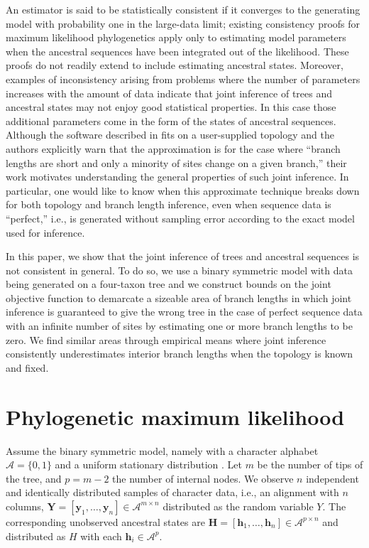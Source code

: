 \documentclass[11pt]{article}
\newcommand{\alphabet}{\mathcal{A}}
\newcommand{\fullAlignment}{\mathbf{Y}}
\newcommand{\alignmentColumn}{\mathbf{y}}
\newcommand{\alignmentColumnRV}{Y}
\newcommand{\fullAncestralStates}{\mathbf{H}}
\newcommand{\ancestralStateColumn}{\mathbf{h}}
\newcommand{\ancestralStateColumnRV}{H}
\newcommand{\nCols}{n}
\newcommand{\nSiteRows}{m}
\newcommand{\nAncestralStateRows}{p}
\begin{document}
An estimator is said to be statistically consistent if it converges to the generating model with probability one in the large-data limit; existing consistency proofs for maximum likelihood phylogenetics \citep{Allman2008-wd,Chai2011-ff,RoyChoudhury2015-ta} apply only to estimating model parameters when the ancestral sequences have been integrated out of the likelihood.
These proofs do not readily extend to include estimating ancestral states.
Moreover, examples of inconsistency arising from problems where the number of parameters increases with the amount of data \citep{Neyman1948-tt} indicate that joint inference of trees and ancestral states may not enjoy good statistical properties.
In this case those additional parameters come in the form of the states of ancestral sequences.
Although the software described in \citet{Sagulenko2018-xl} fits on a user-supplied topology and the authors explicitly warn that the approximation is for the case where ``branch lengths are short and only a minority of sites change on a given branch,'' their work motivates understanding the general properties of such joint inference.
In particular, one would like to know when this approximate technique breaks down for both topology and branch length inference, even when sequence data is ``perfect,'' i.e., is generated without sampling error according to the exact model used for inference.

In this paper, we show that the joint inference of trees and ancestral sequences is not consistent in general.
To do so, we use a binary symmetric model with data being generated on a four-taxon tree and we construct bounds on the joint objective function to demarcate a sizeable area of branch lengths in which joint inference is guaranteed to give the wrong tree in the case of perfect sequence data with an infinite number of sites by estimating one or more branch lengths to be zero.
We find similar areas through empirical means where joint inference consistently underestimates interior branch lengths when the topology is known and fixed.

\section*{Phylogenetic maximum likelihood}

Assume the binary symmetric model, namely with a character alphabet $\alphabet=\{0,1\}$ and a uniform stationary distribution \citep{Semple2003-em}.
Let $\nSiteRows$ be the number of tips of the tree, and $\nAncestralStateRows = \nSiteRows-2$ the number of internal nodes.
We observe $\nCols$ independent and identically distributed samples of character data, i.e., an alignment with $\nCols$ columns, $\fullAlignment=[\alignmentColumn_1,\ldots,\alignmentColumn_\nCols]\in\alphabet^{\nSiteRows\times\nCols}$ distributed as the random variable $\alignmentColumnRV$.
The corresponding unobserved ancestral states are $\fullAncestralStates=[\ancestralStateColumn_1,\ldots,\ancestralStateColumn_\nCols]\in\alphabet^{\nAncestralStateRows\times\nCols}$ and distributed as $\ancestralStateColumnRV$ with each $\ancestralStateColumn_i\in\alphabet^\nAncestralStateRows$.
\end{document}
